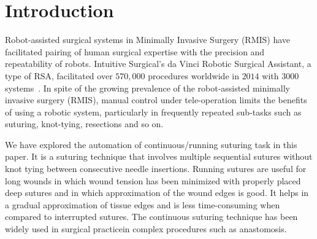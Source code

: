 \documentclass[0-suturing.tex]{subfiles}
\begin{document}
\section{Introduction}
\label{sec:intro}
Robot-assisted surgical systems in Minimally Invasive Surgery (RMIS)
have facilitated pairing of human surgical expertise with the precision and repeatability of robots. Intuitive Surgical's da Vinci Robotic Surgical Assistant, a type of RSA, facilitated over $570,000$ procedures worldwide in $2014$ with $3000$ systems~\cite{AnnualReport2014}.
In spite of the growing prevalence of the robot-assisted minimally invasive surgery (RMIS), manual control under tele-operation limits 
the benefits of using a robotic system, particularly in frequently repeated sub-tasks such as suturing, knot-tying, resections and so on. 



We have explored the automation of continuous/running suturing task in this paper. It is a suturing technique that involves multiple sequential sutures without knot tying between consecutive needle insertions. Running sutures are useful for long wounds in which wound tension has been minimized with properly placed deep sutures and in which approximation of the wound edges is good. It helps in a gradual approximation of tissue edges and is less time-consuming when compared to interrupted sutures. The continuous suturing technique has been widely used in surgical practice\tocite in complex procedures such as  anastomosis\tocite. 
\end{document}
